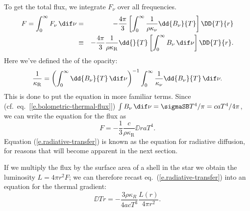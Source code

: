 To get the total flux, we integrate $F_{\nu}$ over all frequencies. 
\begin{eqnarray*}
	F = \int_{0}^{\infty}F_{\nu}\,\dif\nu &=& -\frac{4\pi}{3} \left[\int_{0}^{\infty} \frac{1}{\rho\kappa_{\nu}}\dd{B_{\nu}}{T}\right]\DD{T}{r}\\
	&\equiv& -\frac{4\pi}{3}\frac{1}{\rho\kappa_{\mathrm{R}}}\dd{}{T}\left[\int_{0}^{\infty}B_{\nu}\,\dif\nu\right]\DD{T}{r}.
\end{eqnarray*}
Here we've defined the  of the opacity:
\begin{equation}\label{e.rosseland-opacity}
	\frac{1}{\kappa_{\mathrm{R}}} = \left(\int_{0}^{\infty} \dd{B_{\nu}}{T}\,\dif\nu\right)^{-1}\int_{0}^{\infty} \frac{1}{\kappa_{\nu}}\dd{B_{\nu}}{T}\,\dif\nu.
\end{equation}
This is done to put the equation in more familiar terms. Since (cf.\ eq.~[\ref{e.bolometric-thermal-flux}]) $\int B_{\nu}\,\dif\nu = \sigmaSB T^{4}/\pi = c a T^{4}/4\pi$, we can write the equation for the flux as
\begin{equation}
	F = -\frac{1}{3}\frac{c}{\rho\kappa_{\mathrm{R}}}\DD{}{r}aT^{4}.
\label{e.radiative-transfer}
\end{equation}
Equation (\ref{e.radiative-transfer}) is known as the equation for radiative diffusion, for reasons that will become apparent in the next section.

If we multiply the flux by the surface area of a shell in the star we obtain the luminosity $L = 4\pi r^{2} F$; we can therefore recast eq.~(\ref{e.radiative-transfer}) into an equation for the thermal gradient:
\begin{equation}
    \label{e.gradient-temperature}
    \DD{T}{r} = -\frac{3\rho\kappa_{R}}{4acT^3}\frac{L(r)}{4\pi r^2}.
\end{equation}

